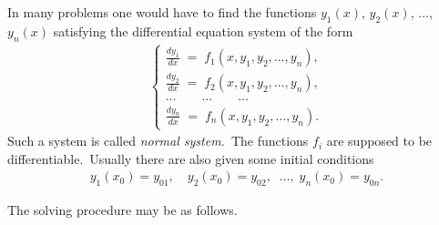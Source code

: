 \documentclass[12pt]{article}
\begin{document}
In many problems one would have to find the functions 
$y_1(x)$, $y_2(x)$, $\ldots$, $y_n(x)$ satisfying the differential equation 
system of the form
\begin{align}
\begin{cases}
  \frac{dy_1}{dx} \;=\; f_1(x,y_1,y_2,\ldots,y_n),\\
  \frac{dy_2}{dx} \;=\; f_2(x,y_1,y_2,\ldots,y_n),\\
   \ldots\qquad\ldots\qquad\ldots\\
  \frac{dy_n}{dx} \;=\; f_n(x,y_1,y_2,\ldots,y_n).             
\end{cases}
\end{align}
Such a system is called {\it normal system.}\, The functions $f_i$ are supposed 
to be differentiable.\, Usually there are also 
given some initial conditions
\begin{align}
y_1(x_0) = y_{01}, \quad y_2(x_0) = y_{02}, \;\;\ldots,\; y_n(x_0) = y_{0n}.
\end{align}

The solving procedure may be as follows.
\end{document}
